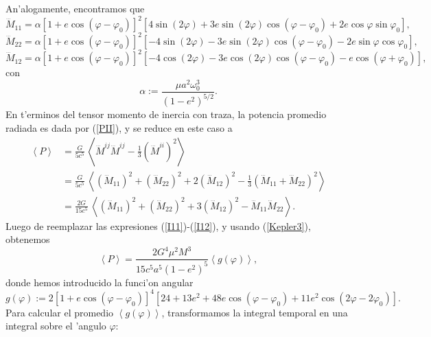 An'alogamente, encontramos que
\begin{equation}\label{I11}
\dddot{M}_{11}=\alpha\left[1+e\cos(\varphi-\varphi_0)\right]^2 \left[4\sin(2\varphi)+3e\sin(2\varphi)\cos(\varphi-\varphi_0)
+2e\cos\varphi\sin\varphi_0\right],
\end{equation}
\begin{equation}\label{I22}
\dddot{M}_{22}=\alpha\left[1+e\cos(\varphi-\varphi_0)\right]^2 \left[-4\sin(2\varphi)-3e\sin(2\varphi)\cos(\varphi-\varphi_0)
-2e\sin\varphi\cos\varphi_0\right],
\end{equation}
\begin{equation}\label{I12}
\dddot{M}_{12}=\alpha\left[1+e\cos(\varphi-\varphi_0)\right]^2 \left[-4\cos(2\varphi)-3e\cos(2\varphi)\cos(\varphi-\varphi_0)
-e\cos(\varphi+\varphi_0)\right],
\end{equation}
con
\begin{equation}
\alpha:=\frac{\mu a^2\omega_0^3}{\left(1-e^2\right)^{5/2}}.
\end{equation}
En t'erminos del tensor momento de inercia con traza, la potencia promedio radiada es dada por (\ref{PII}), y se reduce en este caso a
\begin{align}
\left\langle P\right\rangle &=\frac{G}{5c^5}\, \left\langle \dddot{M}^{ij}\dddot{M}^{ij}-\frac{1}{3}\left(\dddot{M}^{ii}\right)^2\right\rangle \\
&=\frac{G}{5c^5}\, \left\langle \left(\dddot{M}_{11}\right)^2+ \left(\dddot{M}_{22}\right)^2+2 \left(\dddot{M}_{12}\right)^2-\frac{1}{3}\left(\dddot{M}_{11}+\dddot{M}_{22}\right)^2\right\rangle \\
&=\frac{2G}{15c^5}\, \left\langle \left(\dddot{M}_{11}\right)^2+ \left(\dddot{M}_{22}\right)^2+3\left(\dddot{M}_{12}\right)^2 -\dddot{M}_{11}\dddot{M}_{22}\right\rangle .
\end{align}
Luego de reemplazar las expresiones (\ref{I11})-(\ref{I12}), y usando (\ref{Kepler3}), obtenemos
\begin{equation}
\left\langle P\right\rangle = \frac{2G^4\mu^2M^3}{15c^5a^5\left(1-e^2\right)^{5}}\left\langle g(\varphi)\right\rangle ,
\end{equation}
donde hemos introducido la funci'on angular
\begin{equation}\label{Pphi}
g(\varphi):=2\left[1+e\cos(\varphi-\varphi_0)\right]^4
\left[24+13e^2+48e\cos(\varphi-\varphi_0) +11e^2\cos(2\varphi-2\varphi_0)\right].
\end{equation}
Para calcular el promedio $\left\langle g(\varphi)\right\rangle$, transformamos la integral temporal en una integral sobre el 'angulo $\varphi$:

